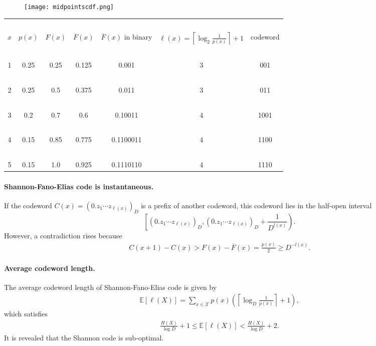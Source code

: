 \documentclass{article}
\numberwithin{equation}{section}
\newcommand{\E}{\mathbb{E}}
\renewcommand{\cal}{\mathcal}
\newcommand{\ol}{\overline}
\theoremstyle{plain}
\theoremstyle{definition}
\begin{document}
\begin{figure}[H]
	\texttt{[image: midpointscdf.png]}
\end{figure}

\begin{table}[H]
\centering
\begin{tabular}{c|c|c|c|c|c|c}
	\hline
	~ & ~ & ~ & ~ & ~ & ~ & ~\\[-2ex]
	$x$ & $p(x)$ & $F(x)$ & $\ol{F}(x)$ & $\ol{F}(x)$ in binary & $\ell(x)=\left\lceil\log_2\frac{1}{p(x)}\right\rceil+1$ & codeword\\[1ex]
	\hline
	~ & ~ & ~ & ~ & ~ & ~ & ~\\[-2.5ex]
	1 & 0.25 & 0.25 & 0.125 & 0.001 & 3 & 001\\
	~ & ~ & ~ & ~ & ~ & ~ & ~\\[-2.5ex]
	2 & 0.25 & 0.5 & 0.375 & 0.011 & 3 & 011\\
	~ & ~ & ~ & ~ & ~ & ~ & ~\\[-2.5ex]
	3 & 0.2 & 0.7 & 0.6 & 0.10011 & 4 & 1001\\
	~ & ~ & ~ & ~ & ~ & ~ & ~\\[-2.5ex]
	4 & 0.15 & 0.85 & 0.775 & 0.1100011& 4 & 1100\\
	~ & ~ & ~ & ~ & ~ & ~ & ~\\[-2.5ex]
	5 & 0.15 & 1.0 & 0.925 & 0.1110110 & 4 & 1110\\
	\hline
\end{tabular}
\end{table}
\paragraph{Shannon-Fano-Elias code is instantaneous.} If the codeword $C(x)=(0.z_1\cdots z_{\ell(x)})_D$ is a prefix of another codeword, this codeword lies in the half-open interval $$\left[(0.z_1\cdots z_{\ell(x)})_D,(0.z_1\cdots z_{\ell(x)})_D+\frac{1}{D^{l(x)}}\right).$$
However, a contradiction rises because
\begin{align*}
	C(x+1)-C(x)>F(x)-\ol{F}(x)=\frac{p(x)}{2}\geq D^{-l(x)}.
\end{align*}
\paragraph{Average codeword length.} The average codeword length of Shannon-Fano-Elias code is given by
\begin{align*}
	\E[\ell(X)]=\sum_{x\in\cal{X}}p(x)\left(\left\lceil\log_D\frac{1}{p(x)}\right\rceil+1\right),
\end{align*}
which satisfies
\begin{align*}
	\frac{H(X)}{\log D}+1\leq\E\left[\ell(X)\right]<\frac{H(X)}{\log D}+2.
\end{align*}
It is revealed that the Shannon code is sub-optimal.
\end{document}
